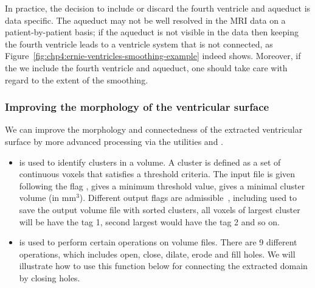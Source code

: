 In practice, the decision to include or discard the fourth ventricle
and aqueduct is data specific. The aqueduct may not be well resolved
in the MRI data on a patient-by-patient basis; if the aqueduct is not
visible in the data then keeping the fourth ventricle leads to a
ventricle system that is not connected, as
Figure~\ref{fig:chp4:ernie-ventricles-smoothing-example} indeed
shows. Moreover, if the we include the fourth ventricle and aqueduct,
one should take care with regard to the extent of the smoothing. 

\subsubsection*{Improving the morphology of the ventricular surface}

We can improve the morphology and connectedness of the extracted
ventricular surface by more advanced processing via the \freesurfer{}
utilities  and .
\begin{itemize}
\item
   is used to identify clusters in a volume. A
  cluster is defined as a set of continuous voxels that satisfies a
  threshold criteria. The input file is given following the flag
  ,  gives a minimum threshold value,
   gives a minimal cluster volume (in
  mm$^3$). Different output flags are
  admissible~\cite{freesurfer-wiki}, including  used to
  save the output volume file with sorted clusters, all voxels of
  largest cluster will be have the tag 1, second largest would have
  the tag 2 and so on.
\item
   is used to perform certain operations on
  volume files. There are 9 different operations, which includes open,
  close, dilate, erode and fill holes. We will illustrate how to use
  this function below for connecting the extracted domain by closing
  holes. 
\end{itemize}

